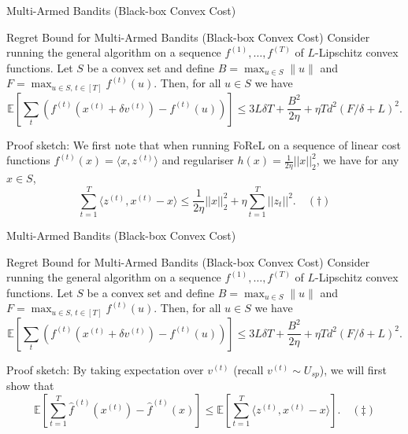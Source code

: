 \begin{frame}{Multi-Armed Bandits (Black-box Convex Cost)}
\small
\begin{block}{Regret Bound for Multi-Armed Bandits (Black-box Convex Cost)}
    Consider running the general algorithm on a
    sequence $f^{(1)}, \ldots, f^{(T)}$ of $L$-Lipschitz convex functions. Let $S$ be a
    convex set and define $B = \max_{u \in S} \|u\|$ and
    $F = \max_{u \in S,\, t \in [T]} f^{(t)}(u)$. Then, for all $u \in S$ we have
    $$
    \mathbb{E}\left[\sum_t \left(f^{(t)}(x^{(t)} + \delta v^{(t)}) - f^{(t)}(u)\right)\right]
    \leq 3L\delta T + \frac{B^2}{2\eta} + \eta T d^2 (F/\delta + L)^2.
    $$
\end{block}
Proof sketch: \pause
We first note that when running FoReL on a sequence of linear cost functions $f^{(t)}(x) = \langle x, z^{(t)} \rangle$ and regulariser $h(x) = \frac{1}{2\eta} ||x||_2^2$, we have for any $x \in S$, 
$$ \sum_{t=1}^T \langle z^{(t)}, x^{(t)} - x \rangle \leq \frac{1}{2\eta}||x||_2^2 + \eta \sum_{t=1}^T ||z_t||^2. \quad (\dag) $$
\end{frame}

\begin{frame}{Multi-Armed Bandits (Black-box Convex Cost)}
\small
\begin{block}{Regret Bound for Multi-Armed Bandits (Black-box Convex Cost)}
    Consider running the general algorithm on a
    sequence $f^{(1)}, \ldots, f^{(T)}$ of $L$-Lipschitz convex functions. Let $S$ be a
    convex set and define $B = \max_{u \in S} \|u\|$ and
    $F = \max_{u \in S,\, t \in [T]} f^{(t)}(u)$. Then, for all $u \in S$ we have
    $$
    \mathbb{E}\left[\sum_t \left(f^{(t)}(x^{(t)} + \delta v^{(t)}) - f^{(t)}(u)\right)\right]
    \leq 3L\delta T + \frac{B^2}{2\eta} + \eta T d^2 (F/\delta + L)^2.
    $$
\end{block}
Proof sketch:
By taking expectation over $v^{(t)}$ (recall $v^{(t)} \sim U_{sp}$), we will first show that 
$$
\mathbb{E}\left[\sum_{t=1}^T \hat{f}^{(t)}(x^{(t)}) - \hat{f}^{(t)}(x) \right] \leq \mathbb{E}\left[\sum_{t=1}^T \langle z^{(t)}, x^{(t)} - x \rangle \right]. \quad (\ddag)
$$
\end{frame}

